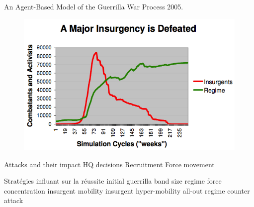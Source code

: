 \documentclass{article}
\begin{document}
An Agent-Based Model of the Guerrilla War Process 2005.


\begin{figure}[H]
	\begin{centering}
	\includegraphics[width=\linewidth]{../ressources/insurgency}
	\end{centering}
\end{figure}
\begin{algorithmic}[1]
			\STATE Attacks and their impact
			\STATE HQ decisions
			\STATE Recruitment
			\STATE Force movement
		\ENDWHILE
		\end{algorithmic}
\cite{doran2005iruba}

Stratégies influant sur la réussite
initial guerrilla band size
regime force concentration
insurgent mobility
insurgent hyper-mobility
all-out regime counter attack
\end{document}
